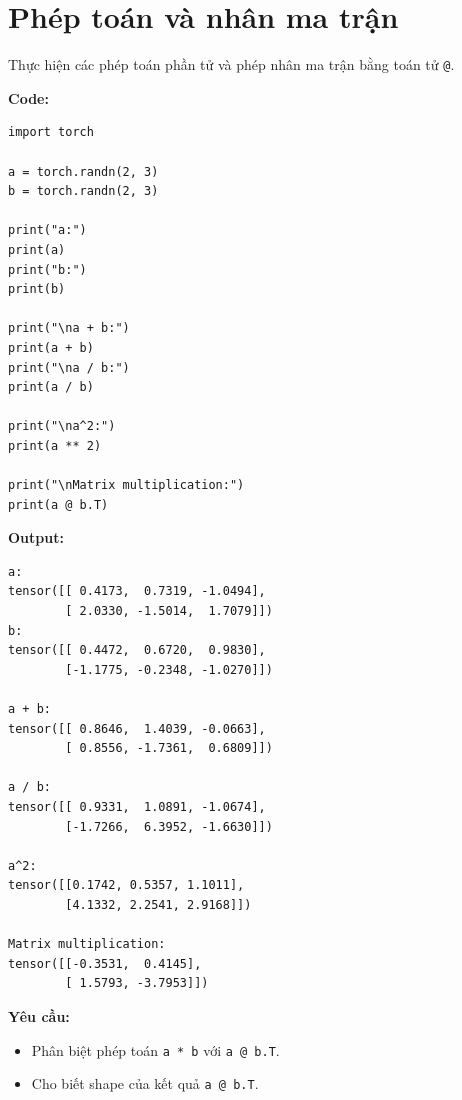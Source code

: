 \documentclass[12pt,a4paper]{article}
\begin{document}
\section{Phép toán và nhân ma trận}
Thực hiện các phép toán phần tử và phép nhân ma trận bằng toán tử \texttt{@}.

\textbf{Code:}
\begin{verbatim}
import torch

a = torch.randn(2, 3)
b = torch.randn(2, 3)

print("a:")
print(a)
print("b:")
print(b)

print("\na + b:")
print(a + b)
print("\na / b:")
print(a / b)

print("\na^2:")
print(a ** 2)

print("\nMatrix multiplication:")
print(a @ b.T)
\end{verbatim}

\textbf{Output:}
\begin{verbatim}
a:
tensor([[ 0.4173,  0.7319, -1.0494],
        [ 2.0330, -1.5014,  1.7079]])
b:
tensor([[ 0.4472,  0.6720,  0.9830],
        [-1.1775, -0.2348, -1.0270]])

a + b:
tensor([[ 0.8646,  1.4039, -0.0663],
        [ 0.8556, -1.7361,  0.6809]])

a / b:
tensor([[ 0.9331,  1.0891, -1.0674],
        [-1.7266,  6.3952, -1.6630]])

a^2:
tensor([[0.1742, 0.5357, 1.1011],
        [4.1332, 2.2541, 2.9168]])

Matrix multiplication:
tensor([[-0.3531,  0.4145],
        [ 1.5793, -3.7953]])
\end{verbatim}

\textbf{Yêu cầu:}
\begin{itemize}
    \item Phân biệt phép toán \texttt{a * b} với \texttt{a @ b.T}.
    \item Cho biết shape của kết quả \texttt{a @ b.T}.
\end{itemize}
\end{document}
